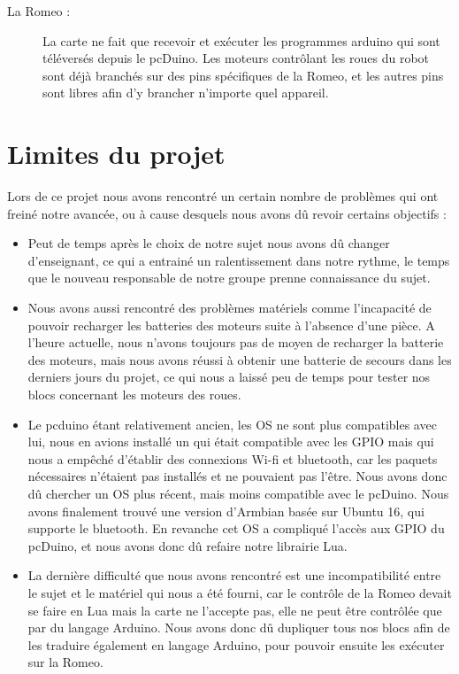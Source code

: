 \documentclass[12pt,francais]{report}
\begin{document}
\begin{description}
\item [La Romeo :] La carte ne fait que recevoir et exécuter les programmes arduino qui sont téléversés depuis le pcDuino. Les moteurs contrôlant les roues du robot sont déjà branchés sur des pins spécifiques de la Romeo, et les autres pins sont libres afin d'y brancher n'importe quel appareil.

\end{description}

\section*{Limites du projet}



Lors de ce projet nous avons rencontré un certain nombre de problèmes qui ont freiné notre avancée, ou à cause desquels nous avons dû revoir certains objectifs :
\begin{itemize}
	\item Peut de temps après le choix de notre sujet nous avons dû changer d'enseignant, ce qui a entrainé un ralentissement dans notre rythme, le temps que le nouveau responsable de notre groupe prenne connaissance du sujet.
	\item Nous avons aussi rencontré des problèmes matériels comme l'incapacité de pouvoir recharger les batteries des moteurs suite à l'absence d'une pièce. A l'heure actuelle, nous n'avons toujours pas de moyen de recharger la batterie des moteurs, mais nous avons réussi à obtenir une batterie de secours dans les derniers jours du projet, ce qui nous a laissé peu de temps pour tester nos blocs concernant les moteurs des roues. 
	\item Le pcduino étant relativement ancien, les OS ne sont plus compatibles avec lui, nous en avions installé un qui était compatible avec les GPIO mais qui nous a empêché d'établir des connexions Wi-fi et bluetooth, car les paquets nécessaires n'étaient pas installés et ne pouvaient pas l'être. Nous avons donc dû chercher un OS plus récent, mais moins compatible avec le pcDuino. Nous avons finalement trouvé une version d'Armbian basée sur Ubuntu 16, qui supporte le bluetooth. En revanche cet OS a compliqué l'accès aux GPIO du pcDuino, et nous avons donc dû refaire notre librairie Lua.
	\item La dernière difficulté que nous avons rencontré est une incompatibilité entre le sujet et le matériel qui nous a été fourni, car le contrôle de la Romeo devait se faire en Lua mais la carte ne l'accepte pas, elle ne peut être contrôlée que par du langage Arduino. Nous avons donc dû dupliquer tous nos blocs afin de les traduire également en langage Arduino, pour pouvoir ensuite les exécuter sur la Romeo.	
\end{itemize}
\end{document}
